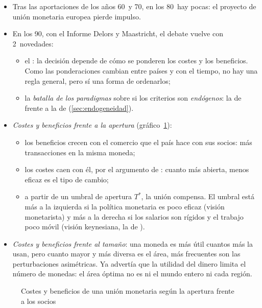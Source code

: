 \documentclass[11pt]{article}
\begin{document}
\begin{itemize}
\item Tras las aportaciones de los años 60~y 70, en los 80~hay pocas: el proyecto de unión monetaria europea pierde impulso.
\item En los 90, con el Informe Delors y Maastricht, el debate vuelve con 2~novedades\nocite{Mongelli2002New}:
  \begin{itemize}
  \item el : la decisión depende de cómo se ponderen los costes y los beneficios. Como las ponderaciones cambian entre países y con el tiempo, no hay una regla general, pero sí una forma de ordenarlos;
  \item la \emph{batalla de los paradigmas} sobre si los criterios son \emph{endógenos}: la  de \textcite{Krugman1993Lessons} frente a la  de \textcite{FrankelRose1998Endogeneity} (\ref{sec:endogeneidad}).
  \end{itemize}
\item \emph{Costes y beneficios frente a la apertura} (gráfico~\ref{fig:costes-beneficios}):
  \begin{itemize}
  \item los beneficios crecen con el comercio que el país hace con sus socios: más transacciones en la misma moneda;
  \item los costes caen con él, por el argumento de : cuanto más abierta, menos eficaz es el tipo de cambio;
  \item a partir de un umbral de apertura $T^*$, la unión compensa\nocite{DeGrauwe2022Economics}. El umbral está más a la izquierda si la política monetaria es poco eficaz (visión monetarista) y más a la derecha si los salarios son rígidos y el trabajo poco móvil (visión keynesiana, la de ).
  \end{itemize}
\item \emph{Costes y beneficios frente al tamaño}: una moneda es más útil cuantos más la usan, pero cuanto mayor y más diversa es el área, más frecuentes son las perturbaciones asimétricas. Ya \textcite{Mundell1961Theory} advertía que la utilidad del dinero limita el número de monedas: el área óptima no es ni el mundo entero ni cada región.
\end{itemize}

\begin{figure}[H]
\centering
\caption{Costes y beneficios de una unión monetaria según la apertura frente a los socios}\label{fig:costes-beneficios}
\end{figure}
\end{document}
